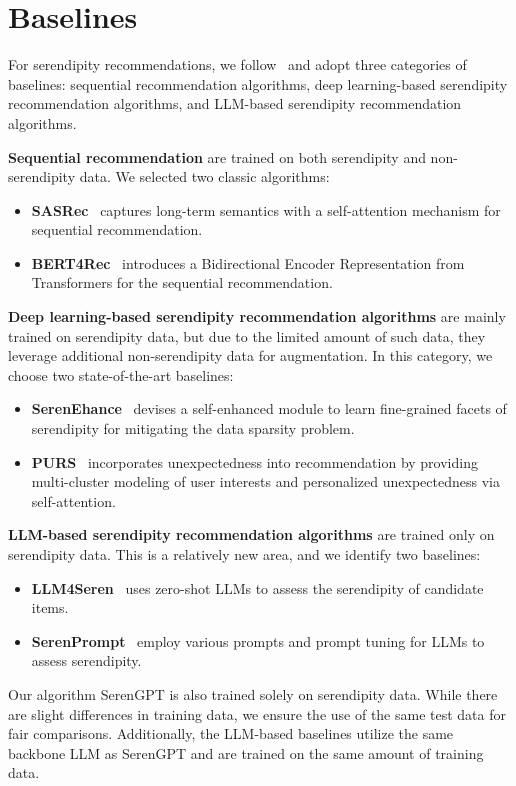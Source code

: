 \appendix
\section{Baselines}\label{app:baselines}
 For serendipity recommendations, we follow~\cite{fu2024art} and adopt three categories of baselines: sequential recommendation algorithms, deep learning-based serendipity recommendation algorithms, and LLM-based serendipity recommendation algorithms.

\textbf{Sequential recommendation} are trained on both serendipity and non-serendipity data. We selected two classic algorithms: 
\begin{itemize}
    \item \textbf{SASRec}~\cite{kang2018self} captures long-term semantics with a self-attention mechanism for sequential recommendation.
    \item \textbf{BERT4Rec}~\cite{sun2019bert4rec} introduces a Bidirectional Encoder Representation from Transformers for the sequential recommendation.
\end{itemize}
\textbf{Deep learning-based serendipity recommendation algorithms} are mainly trained on serendipity data, but due to the limited amount of such data, they leverage additional non-serendipity data for augmentation. In this category, we choose two state-of-the-art baselines: 
\begin{itemize}
    \item \textbf{SerenEhance}~\cite{fu2023wisdom} devises a self-enhanced module to learn fine-grained facets of serendipity for mitigating the data sparsity problem.
    \item \textbf{PURS}~\cite{li2020purs}  incorporates unexpectedness into recommendation by providing multi-cluster modeling of user interests and personalized unexpectedness via self-attention.
\end{itemize}
\textbf{LLM-based serendipity recommendation algorithms} are trained only on serendipity data. This is a relatively new area, and we identify two baselines:
\begin{itemize}
    \item \textbf{LLM4Seren}~\cite{tokutake2024can} uses zero-shot LLMs to assess the serendipity of candidate items.
    \item \textbf{SerenPrompt}~\cite{fu2024art} employ various prompts and prompt tuning for LLMs to assess serendipity.
\end{itemize}
Our algorithm SerenGPT is also trained solely on serendipity data. While there are slight differences in training data, we ensure the use of the same test data for fair comparisons. Additionally, the LLM-based baselines utilize the same backbone LLM as SerenGPT and are trained on the same amount of training data.




